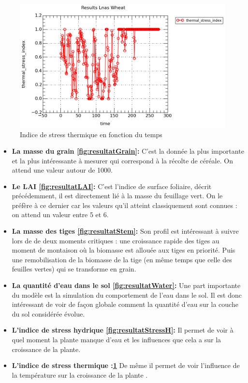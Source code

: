 \begin{figure}

\begin{center}
 \includegraphics[scale = 0.5]{./img/thermicStress.png}
 \caption{Indice de stress thermique en fonction du temps}
 \label{fig:resultatStressT}
\end{center}

\end{figure}

\begin{itemize}

	\item \textbf {La masse du grain \ref{fig:resultatGrain}:} C'est la donnée la plus importante et la plus intéressante à mesurer qui correspond à la récolte de céréale. On attend une valeur autour de 1000.
	
	\item \textbf{Le LAI \ref{fig:resultatLAI}:} C'est l'indice de surface foliaire, décrit précédemment, il est directement lié à la masse du feuillage vert. On le préfère à ce dernier car les valeurs qu'il atteint classiquement sont connues : on attend un valeur entre 5 et 6.
	
	\item \textbf{La masse des tiges \ref{fig:resultatStem}:} Son profil est intéressant à suivre lors de de deux moments critiques : une croissance rapide des tiges au moment de montaison où la biomasse est allouée aux tiges en priorité. Puis une remobilisation de la biomasse de la tige (en même temps que celle des feuilles vertes) qui se transforme en grain.
	
	\item \textbf{La quantité d'eau dans le sol \ref{fig:resultatWater}:} Une part importante du modèle est la simulation du comportement de l'eau dans le sol. Il est donc intéressant de voir de façon globale comment la quantité d'eau sur la couche du sol considérée évolue.
	
	\item \textbf{L'indice de stress hydrique \ref{fig:resultatStressH}:} Il permet de voir à quel moment la plante manque d'eau et les influences que cela a sur la croissance de la plante.
	
	\item \textbf{L'indice de stress thermique :\ref{fig:resultatStressT}} De même il permet de voir l'influence de la température sur la croissance de la plante .

\end{itemize}

